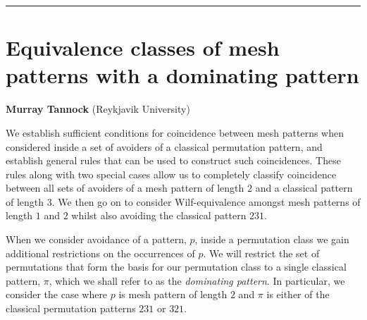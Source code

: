 \documentclass[11pt,a4paper]{article}
\newcommand{\talkTitle}[1]{\hrule\section*{\textsf{\textmd{\LARGE #1}}}}
\newcommand{\talkPresenter}[1]{\textbf{\large #1}}
\newcommand{\talkAffiliation}[1]{(#1)}
\begin{document}
\newcommand{\textpattern}[4][]{%
    \raisebox{0.6ex}{
    \begin{tikzpicture}[scale=\textscale, baseline=(current bounding box.center), #1]
        \shadeboxes{#4}
        \clpattern[8]{#2}{#3}
    \end{tikzpicture}}\;
}

\newcommand{\modpattern}[4][5]{%
    \shadeboxes{#4}
    \clpattern[#1]{#2}{#3}}

    \newcommand{\decompleft}[5]{%
        \begin{tikzpicture}[scale=1.0, baseline=(current bounding box.center)]
            \fill[pattern=north east lines, pattern color=black!75] (0,-1) rectangle +(-0.5,2);
            \foreach \x/\y in {#1}
                \fill[pattern=north east lines, pattern color=black!75] (\x,\y-1) rectangle +(1,1);
            \draw (0,1) -- (0,-1)
                  (-0.5,0) -- (2,0)
                  (1,1) -- (1,-1);
            \filldraw (0,0) circle (3pt);
            \draw (1.5, 0.5) node {\(#5\)};
            \draw (1.5, -0.5) node {\(#3\)};
            \draw (0.5, 0.5) node {\(#4\)};
            \draw (0.5, -0.5) node {\(#2\)};
        \end{tikzpicture}
    }



\talkTitle{Equivalence classes of mesh patterns with a dominating pattern}
\talkPresenter{Murray Tannock}
\talkAffiliation{Reykjavik University}


We establish sufficient conditions for coincidence between mesh patterns when
considered inside a set of avoiders of a classical permutation pattern, and
establish general rules that can be used to construct such coincidences. These
rules along with two special cases allow us to completely classify coincidence
between all sets of avoiders of a mesh pattern of length \(2\) and a classical
pattern of length \(3\). We then go on to consider Wilf-equivalence amongst
mesh patterns of length \(1\) and \(2\) whilst also avoiding the classical pattern
\(231\).

When we consider avoidance of a pattern, \(p\), inside a permutation class we gain
additional restrictions on the occurrences of \(p\).
We will restrict the set of permutations that form the basis
for our permutation class to a single classical pattern, \(\pi\), which we shall
refer to as the \emph{dominating pattern}. In particular, we consider the case
where \(p\) is mesh pattern of length \(2\) and \(\pi\) is either of the classical
permutation patterns \(231\) or \(321\).
\end{document}
